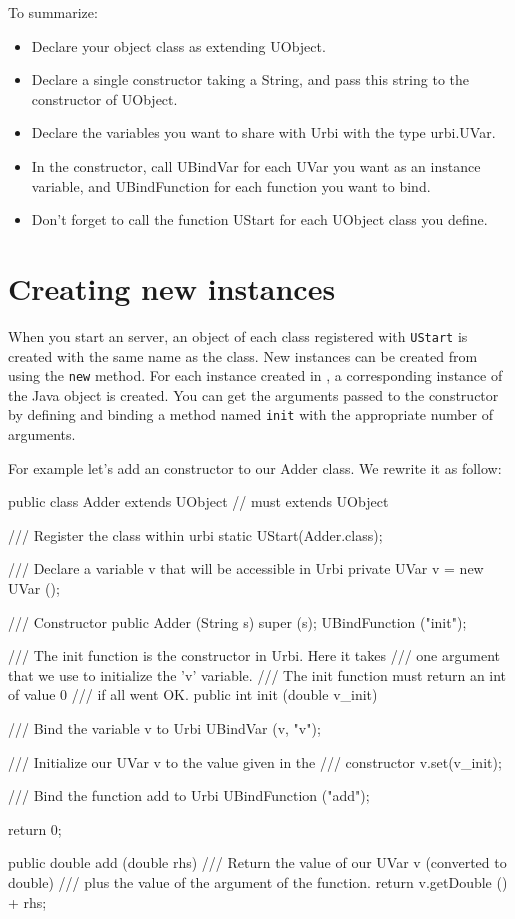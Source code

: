 To summarize:

\begin{itemize}
\item Declare your object class as extending UObject.
\item Declare a single constructor taking a String, and pass this string to
  the constructor of UObject.
\item Declare the variables you want to share with Urbi with the type
  urbi.UVar.
\item In the constructor, call UBindVar for each UVar you want as an
  instance variable, and UBindFunction for each function you want to bind.
\item Don't forget to call the function UStart for each UObject class you
  define.
\end{itemize}

\section{Creating new instances}
\label{sec:uob:apijava:new}

When you start an \urbi server, an object of each class registered with
\lstinline{UStart} is created with the same name as the class. New instances
can be created from \urbi using the \lstinline|new| method. For each
instance created in \urbi, a corresponding instance of the Java object is
created. You can get the arguments passed to the constructor by defining and
binding a method named \lstinline|init| with the appropriate number of
arguments.

For example let's add an \urbi constructor to our Adder class. We rewrite
it as follow:

\begin{java}
public class Adder extends UObject // must extends UObject
{
  /// Register the class within urbi
  static { UStart(Adder.class); }

  /// Declare a variable v that will be accessible in Urbi
  private UVar v = new UVar ();

  /// Constructor
  public Adder (String s)
  {
    super (s);
    UBindFunction ("init");
  }

  /// The init function is the constructor in Urbi. Here it takes
  /// one argument that we use to initialize the 'v' variable.
  /// The init function must return an int of value 0
  /// if all went OK.
  public int init (double v_init)
  {
    /// Bind the variable v to Urbi
    UBindVar (v, "v");

    /// Initialize our UVar v to the value given in the
    /// constructor
    v.set(v_init);

    /// Bind the function add to Urbi
    UBindFunction ("add");

    return 0;
  }

  public double add (double rhs)
  {
    /// Return the value of our UVar v (converted to double)
    /// plus the value of the argument of the function.
    return v.getDouble () + rhs;
  }
}
\end{java}

